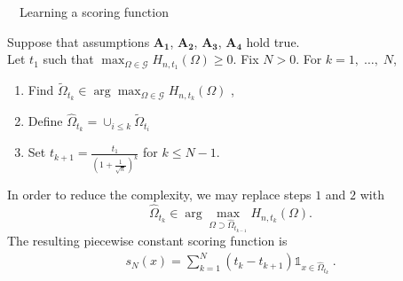 \begin{algorithm} 
\caption{~~Learning a scoring function}
\label{aistat:algo1} 
Suppose that assumptions $\mathbf{A_1}$, $\mathbf{A_2}$, $\mathbf{A_3}$, $\mathbf{A_4}$ hold true.\\ Let $t_1$ such that $\max_{\Omega \in \mathcal{G}}H_{n,t_1}(\Omega)
\ge  0$. 
Fix  $N>0$. %
For $k=1,\; \ldots,\; N$, 
\begin{enumerate} 
\item   Find  $\tilde{\Omega}_{t_k} \in \arg\max_{\Omega \in \mathcal{G}}
H_{n,t_k}(\Omega)$ , %
\item  Define $\hat \Omega_{t_k}= \cup_{i \le k} \tilde \Omega_{t_i}$
\item  Set  $ t_{k+1} =\frac{t_1}{(1+\frac{1}{\sqrt n})^{k}}   $ for $k\le N-1$. %
\end{enumerate} 

In order to reduce the complexity, we may replace steps $1$ and $2$
with $$\hat {\Omega}_{t_k} \in \arg\max_{\Omega \supset \hat \Omega_{t_{k-1}}} H_{n,t_k}(\Omega).$$
\noindent
The resulting piecewise constant scoring function is
\begin{align}
\label{aistat:definition_sN}
s_N(x)= \sum_{k=1}^{N}(t_{k}-t_{k+1}) \mathds{1}_{x \in \hat{\Omega}_{t_k}}~.
\end{align}
\end{algorithm}




